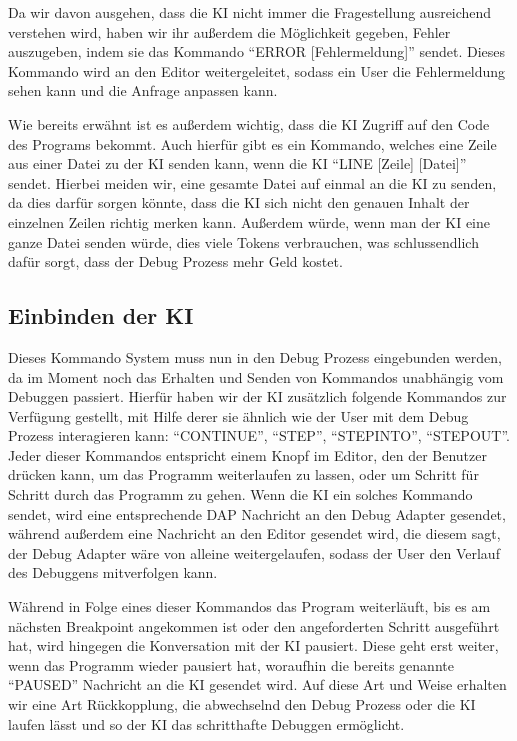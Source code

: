 \documentclass[a4paper,12pt,ngerman]{scrartcl}
\begin{document}
Da wir davon ausgehen, dass die KI nicht immer die Fragestellung ausreichend verstehen wird, haben wir ihr außerdem die Möglichkeit gegeben, Fehler auszugeben, indem sie das Kommando ``ERROR [Fehlermeldung]'' sendet. Dieses Kommando wird an den Editor weitergeleitet, sodass ein User die Fehlermeldung sehen kann und die Anfrage anpassen kann.

Wie bereits erwähnt ist es außerdem wichtig, dass die KI Zugriff auf den Code des Programs bekommt. Auch hierfür gibt es ein Kommando, welches eine Zeile aus einer Datei zu der KI senden kann, wenn die KI ``LINE [Zeile] [Datei]'' sendet. Hierbei meiden wir, eine gesamte Datei auf einmal an die KI zu senden, da dies darfür sorgen könnte, dass die KI sich nicht den genauen Inhalt der einzelnen Zeilen richtig merken kann. Außerdem würde, wenn man der KI eine ganze Datei senden würde, dies viele Tokens verbrauchen, was schlussendlich dafür sorgt, dass der Debug Prozess mehr Geld kostet.

\subsection{Einbinden der KI}

Dieses Kommando System muss nun in den Debug Prozess eingebunden werden, da im Moment noch das Erhalten und Senden von Kommandos unabhängig vom Debuggen passiert. Hierfür haben wir der KI zusätzlich folgende Kommandos zur Verfügung gestellt, mit Hilfe derer sie ähnlich wie der User mit dem Debug Prozess interagieren kann: ``CONTINUE'', ``STEP'', ``STEPINTO'', ``STEPOUT''. Jeder dieser Kommandos entspricht einem Knopf im Editor, den der Benutzer drücken kann, um das Programm weiterlaufen zu lassen, oder um Schritt für Schritt durch das Programm zu gehen. Wenn die KI ein solches Kommando sendet, wird eine entsprechende DAP Nachricht an den Debug Adapter gesendet, während außerdem eine Nachricht an den Editor gesendet wird, die diesem sagt, der Debug Adapter wäre von alleine weitergelaufen, sodass der User den Verlauf des Debuggens mitverfolgen kann.

Während in Folge eines dieser Kommandos das Program weiterläuft, bis es am nächsten Breakpoint angekommen ist oder den angeforderten Schritt ausgeführt hat, wird hingegen die Konversation mit der KI pausiert. Diese geht erst weiter, wenn das Programm wieder pausiert hat, woraufhin die bereits genannte ``PAUSED'' Nachricht an die KI gesendet wird. Auf diese Art und Weise erhalten wir eine Art Rückkopplung, die abwechselnd den Debug Prozess oder die KI laufen lässt und so der KI das schritthafte Debuggen ermöglicht.
\end{document}
